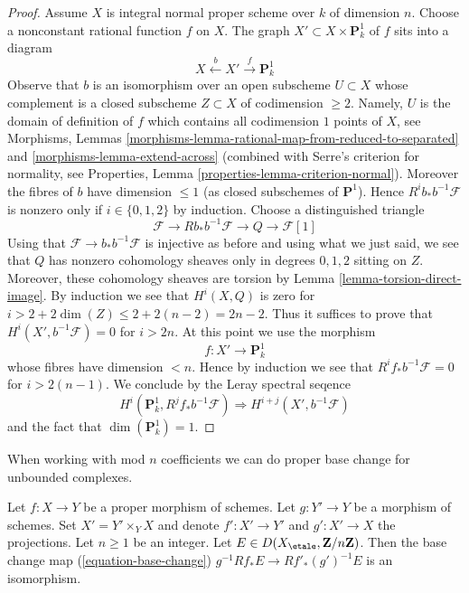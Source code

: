 \begin{proof}
\medskip\noindent
Assume $X$ is integral normal proper scheme over $k$ of dimension $n$.
Choose a nonconstant rational function $f$ on $X$. The graph
$X' \subset X \times \mathbf{P}^1_k$ of $f$ sits into a diagram
$$
X \xleftarrow{b} X' \xrightarrow{f} \mathbf{P}^1_k
$$
Observe that $b$ is an isomorphism over an open subscheme
$U \subset X$ whose complement is a closed subscheme
$Z \subset X$ of codimension $\geq 2$. Namely, $U$ is the
domain of definition of $f$ which contains all codimension $1$
points of $X$, see
Morphisms, Lemmas \ref{morphisms-lemma-rational-map-from-reduced-to-separated}
and \ref{morphisms-lemma-extend-across}
(combined with Serre's criterion for normality, see
Properties, Lemma \ref{properties-lemma-criterion-normal}).
Moreover the fibres of $b$ have dimension $\leq 1$ (as closed subschemes
of $\mathbf{P}^1$). Hence $R^ib_*b^{-1}\mathcal{F}$ is nonzero only
if $i \in \{0, 1, 2\}$ by induction. Choose a distinguished triangle
$$
\mathcal{F} \to Rb_*b^{-1}\mathcal{F} \to Q \to \mathcal{F}[1]
$$
Using that $\mathcal{F} \to b_*b^{-1}\mathcal{F}$ is injective
as before and using what we just said, we see that $Q$ has nonzero
cohomology sheaves only in degrees $0, 1, 2$ sitting on $Z$.
Moreover, these cohomology sheaves are torsion by
Lemma \ref{lemma-torsion-direct-image}.
By induction we see that $H^i(X, Q)$ is zero for
$i > 2 + 2\dim(Z) \leq 2 + 2(n - 2) = 2n - 2$. Thus it suffices
to prove that $H^i(X', b^{-1}\mathcal{F}) = 0$ for
$i > 2n$. At this point we use the morphism
$$
f : X' \to \mathbf{P}^1_k
$$
whose fibres have dimension $< n$. Hence by induction we see that
$R^if_*b^{-1}\mathcal{F} = 0$ for $i > 2(n - 1)$.
We conclude by the Leray spectral seqence
$$
H^i(\mathbf{P}^1_k, R^jf_*b^{-1}\mathcal{F})
\Rightarrow
H^{i + j}(X', b^{-1}\mathcal{F})
$$
and the fact that $\dim(\mathbf{P}^1_k) = 1$.
\end{proof}

\noindent
When working with mod $n$ coefficients we can do proper
base change for unbounded complexes.

\begin{lemma}
\label{lemma-proper-base-change-mod-n}
Let $f : X \to Y$ be a proper morphism of schemes. Let $g : Y' \to Y$ be
a morphism of schemes. Set $X' = Y' \times_Y X$ and denote
$f' : X' \to Y'$ and $g' : X' \to X$ the projections.
Let $n \geq 1$ be an integer.
Let $E \in D(X_\etale, \mathbf{Z}/n\mathbf{Z})$.
Then the base change map (\ref{equation-base-change})
$g^{-1}Rf_*E \to Rf'_*(g')^{-1}E$
is an isomorphism.
\end{lemma}

